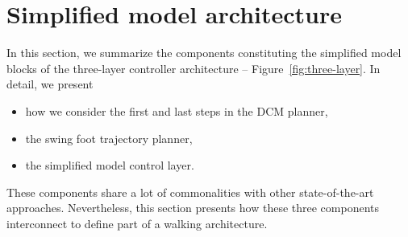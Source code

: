 \section{Simplified model architecture \label{sec:simplified_model_architecture}}
In this section, we summarize the components constituting the simplified model blocks of the three-layer controller architecture -- Figure~\ref{fig:three-layer}. In detail, we present
\begin{itemize}
    \item how we consider the first and last steps in the DCM planner,
    \item the swing foot trajectory planner,
    \item the simplified model control layer.
\end{itemize}
These components share a lot of commonalities with other state-of-the-art
approaches. Nevertheless, this section presents how these three components
interconnect to define part of a walking architecture.



